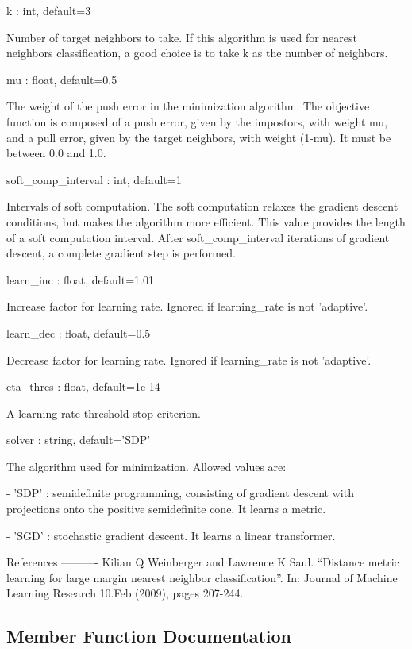 \begin{DoxyVerb}
k : int, default=3

    Number of target neighbors to take. If this algorithm is used for nearest neighbors classification, a good choice is
    to take k as the number of neighbors.

mu : float, default=0.5

    The weight of the push error in the minimization algorithm. The objective function is composed of a push error, given by the impostors,
    with weight mu, and a pull error, given by the target neighbors, with weight (1-mu). It must be between 0.0 and 1.0.

soft_comp_interval : int, default=1

    Intervals of soft computation. The soft computation relaxes the gradient descent conditions, but makes the algorithm more efficient.
    This value provides the length of a soft computation interval. After soft_comp_interval iterations of gradient descent, a complete
    gradient step is performed.

learn_inc : float, default=1.01

    Increase factor for learning rate. Ignored if learning_rate is not 'adaptive'.

learn_dec : float, default=0.5

    Decrease factor for learning rate. Ignored if learning_rate is not 'adaptive'.

eta_thres : float, default=1e-14

    A learning rate threshold stop criterion.

solver : string, default='SDP'

    The algorithm used for minimization. Allowed values are:

    - 'SDP' : semidefinite programming, consisting of gradient descent with projections onto the positive semidefinite cone.
              It learns a metric.

    - 'SGD' : stochastic gradient descent. It learns a linear transformer.

References
----------
    Kilian Q Weinberger and Lawrence K Saul. “Distance metric learning for large margin nearest
    neighbor classification”. In: Journal of Machine Learning Research 10.Feb (2009), pages 207-244.
\end{DoxyVerb}
 

\subsection{Member Function Documentation}
